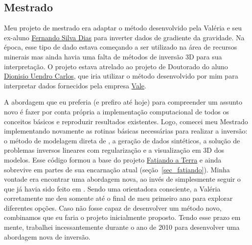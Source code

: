 \documentclass[10pt,a4paper,oneside]{book}
\begin{document}
\subsection{Mestrado}

Meu projeto de mestrado era adaptar o método desenvolvido
pela Valéria e seu ex-aluno
\href{https://www.researchgate.net/profile/Fernando-Dias-8}{Fernando Silva Dias}
\citep{SilvaDias2009} para inverter dados de gradiente da gravidade.
Na época, esse tipo de dado estava começando a ser utilizado na área de
recursos minerais mas ainda havia uma falta de métodos de inversão 3D para sua
interpretação.
O projeto estava atrelado ao projeto de Doutorado do aluno
\href{https://www.linkedin.com/in/dionisio-uendro-carlos-093671225/}{Dionisio Uendro Carlos},
que iria utilizar o método desenvolvido por mim para interpretar dados
fornecidos pela empresa \href{https://vale.com/}{Vale}.

A abordagem que eu preferia (e prefiro até hoje) para compreender um assunto
novo é fazer por conta própria a implementação computacional de todos os
conceitos básicos e reproduzir resultados existentes.
Logo, comecei meu Mestrado implementando novamente as rotinas básicas
necessárias para realizar a inversão: o método de modelagem direta de
\citet{Nagy2000}, a geração de dados sintéticos, a solução de problemas
inversos lineares com regularização e a visualização em 3D dos modelos.
Esse código formou a base do projeto
\href{https://www.fatiando.org}{Fatiando a Terra} e ainda sobrevive em partes
de sua encarnação atual (seção~\ref{sec_fatiando}).
Minha vontade era encontrar uma abordagem nova, ao invés de simplesmente seguir
o que já havia sido feito em \citet{SilvaDias2009}.
Sendo uma orientadora consciente, a Valéria corretamente me deu somente até o
final de meu primeiro ano para explorar diferentes opções.
Caso não fosse capaz de desenvolver um método novo, combinamos que eu faria o
projeto inicialmente proposto.
Tendo esse prazo em mente, trabalhei incessantemente durante o ano de 2010 para
desenvolver uma abordagem nova de inversão.
\end{document}
